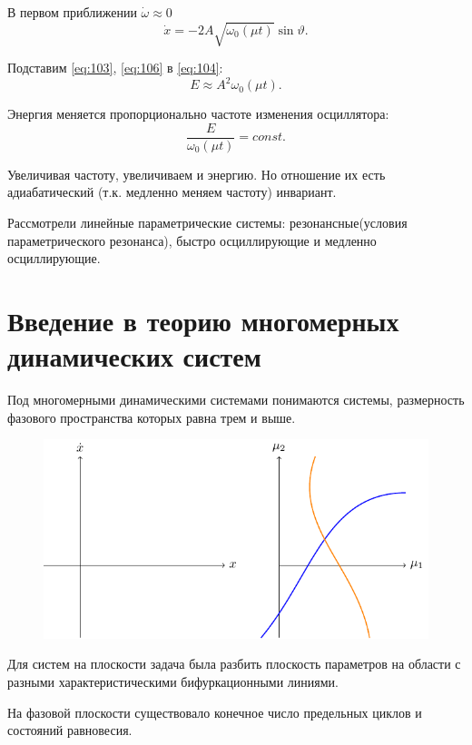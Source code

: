 В первом приближении $\dot \omega \approx 0$
\begin{equation}
	\dot{x}=-2A\sqrt{\omega_0(\mu t)}\sin\vartheta.
	\label{eq:106}	
\end{equation}

Подставим \eqref{eq:103}, \eqref{eq:106} в \eqref{eq:104}:
\begin{equation*}
	E \approx A^2 \omega_0(\mu t).
\end{equation*}

Энергия меняется пропорционально частоте изменения осциллятора:
\begin{equation*}
	\frac{E}{\omega_0(\mu t)}=const.
\end{equation*}

Увеличивая частоту, увеличиваем и энергию. Но отношение их есть адиабатический (т.к. медленно меняем частоту) инвариант. 

Рассмотрели линейные параметрические системы: резонансные(условия параметрического резонанса), быстро осциллирующие и медленно осциллирующие.

\section{Введение в теорию многомерных динамических систем}
Под многомерными динамическими системами понимаются системы, размерность фазового пространства которых равна трем и выше. 
\begin{figure} 
	\vspace{0.1em}
	\centering
	\includegraphics[scale=1]{fig/fig48.pdf}
	\vspace{-0.25em}
\end{figure}
Для систем на плоскости задача была разбить плоскость параметров на области с разными характеристическими бифуркационными линиями.

На фазовой плоскости существовало конечное число предельных циклов и состояний равновесия.

